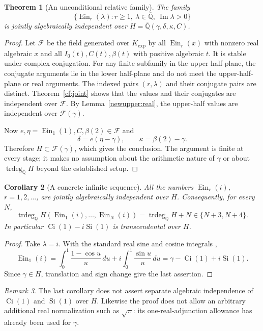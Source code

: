 \documentclass[11pt]{article}
\newtheorem{theorem}{Theorem}[section]
\newtheorem{corollary}[theorem]{Corollary}
\theoremstyle{definition}
\theoremstyle{remark}
\newtheorem{remark}[theorem]{Remark}
\newcommand{\Qa}{\overline{\mathbb Q}}
\newcommand{\trdeg}{\operatorname{trdeg}}
\newcommand{\Ein}{\operatorname{Ein}}
\newcommand{\Kexp}{K_{\mathrm{exp}}}
\begin{document}
\begin{theorem}[An unconditional relative family]
\label{newupper:main}
The family
\[
 \{\Ein_r(\lambda):r\ge1,\
       \lambda\in\Qa,\ \operatorname{Im}\lambda>0\}
\]
is jointly algebraically independent over
$H=\Qa(\gamma,\delta,\kappa,C)$.
\end{theorem}
\begin{proof}
Let $\mathcal F$ be the field generated over $\Kexp$ by all
$\Ein_r(x)$ with nonzero real algebraic $x$ and all
$I_0(t),C(t),\beta(t)$ with positive algebraic $t$. It is stable under
complex conjugation. For any finite subfamily in the upper half-plane,
the conjugate arguments lie in the lower half-plane and do not meet the upper-half-plane or real arguments. The indexed
pairs $(r,\lambda)$ and their conjugate pairs are distinct. Theorem~\ref{cf:joint} shows that the values and
their conjugates are independent over $\mathcal F$. By
Lemma~\ref{newupper:real}, the upper-half values are independent
over $\mathcal F(\gamma)$.

Now $e,\eta=\Ein_1(1),C,\beta(2)\in \mathcal F$ and
\[
 \delta=e(\eta-\gamma),\qquad \kappa=\beta(2)-\gamma.
\]
Therefore $H\subset \mathcal F(\gamma)$, which gives the conclusion.
The argument is finite at every stage; it makes no assumption
about the arithmetic nature of $\gamma$ or about
$\operatorname{trdeg}_{\Qa}H$ beyond the established setup.
\end{proof}

\begin{corollary}[A concrete infinite sequence]
\label{newupper:i}
All the numbers $\Ein_r(i)$, $r=1,2,\ldots$, are
jointly algebraically independent over $H$. Consequently, for every $N$,
\[
 \trdeg_{\Qa}H(\Ein_1(i),\ldots,\Ein_N(i))=\trdeg_{\Qa}H+N
 \in\{N+3,N+4\}.
\] In particular
$\operatorname{Ci}(1)-i\operatorname{Si}(1)$ is transcendental over $H$.
\end{corollary}
\begin{proof}
Take $\lambda=i$. With the standard real sine and cosine integrals \cite[\S6.6]{DLMF},
\[
 \Ein_1(i)
 =\int_0^1\frac{1-\cos u}{u}\,du
       +i\int_0^1\frac{\sin u}{u}\,du
 =\gamma-\operatorname{Ci}(1)+i\operatorname{Si}(1).
\]
Since $\gamma\in H$, translation and sign change give the last assertion.
\end{proof}

\begin{remark}
The last corollary does not assert separate algebraic independence
of $\operatorname{Ci}(1)$ and $\operatorname{Si}(1)$ over $H$.
Likewise the proof does not allow an arbitrary additional real
normalization such as $\sqrt\pi$: its one-real-adjunction allowance
has already been used for $\gamma$.
\end{remark}
\end{document}
